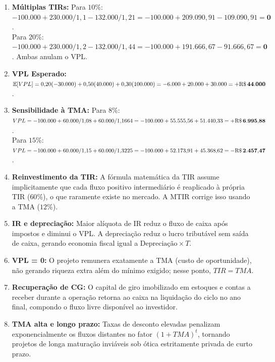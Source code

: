 \begin{boxGabarito}
\begin{enumerate}[leftmargin=1.5em, itemsep=4pt]
  Escolher \textbf{Projeto X} (maior VAUE).
  \item \textbf{Múltiplas TIRs:}
  Para $10\%$: $-100.000 + 230.000/1{,}1 - 132.000/1{,}21 = -100.000 + 209.090{,}91 - 109.090{,}91 = \mathbf{0}$. \\
  Para $20\%$: $-100.000 + 230.000/1{,}2 - 132.000/1{,}44 = -100.000 + 191.666{,}67 - 91.666{,}67 = \mathbf{0}$. Ambas anulam o VPL.
  \item \textbf{VPL Esperado:} $\mathbb{E}[VPL] = 0{,}20(-30.000) + 0{,}50(40.000) + 0{,}30(100.000) = -6.000 + 20.000 + 30.000 = \mathbf{+\text{R\$\,}{44.000}}$.
  \item \textbf{Sensibilidade à TMA:}
  Para $8\%$: $VPL = -100.000 + 60.000/1{,}08 + 60.000/1{,}1664 = -100.000 + 55.555{,}56 + 51.440{,}33 = \mathbf{+\text{R\$\,}{6.995{,}88}}$. \\
  Para $15\%$: $VPL = -100.000 + 60.000/1{,}15 + 60.000/1{,}3225 = -100.000 + 52.173{,}91 + 45.368{,}62 = \mathbf{-\text{R\$\,}{2.457{,}47}}$.
  \item \textbf{Reinvestimento da TIR:} A fórmula matemática da TIR assume implicitamente que cada fluxo positivo intermediário é reaplicado à própria TIR ($60\%$), o que raramente existe no mercado. A MTIR corrige isso usando a TMA ($12\%$).
  \item \textbf{IR e depreciação:} Maior alíquota de IR reduz o fluxo de caixa após impostos e diminui o VPL. A depreciação reduz o lucro tributável sem saída de caixa, gerando economia fiscal igual a $\text{Depreciação} \times T$.
  \item \textbf{VPL = 0:} O projeto remunera exatamente a TMA (custo de oportunidade), não gerando riqueza extra além do mínimo exigido; nesse ponto, $TIR = TMA$.
  \item \textbf{Recuperação de CG:} O capital de giro imobilizado em estoques e contas a receber durante a operação retorna ao caixa na liquidação do ciclo no ano final, compondo o fluxo livre disponível ao investidor.
  \item \textbf{TMA alta e longo prazo:} Taxas de desconto elevadas penalizam exponencialmente os fluxos distantes no fator $(1+TMA)^t$, tornando projetos de longa maturação inviáveis sob ótica estritamente privada de curto prazo.
\end{enumerate}
\end{boxGabarito}

